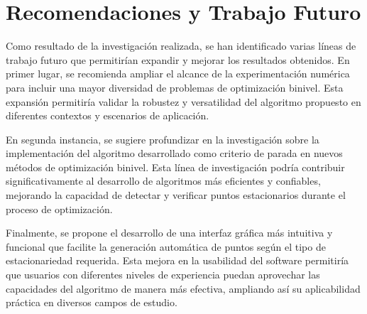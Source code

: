 \chapter{Recomendaciones y Trabajo Futuro}

Como resultado de la investigación realizada, se han identificado varias líneas de trabajo futuro que permitirían expandir y mejorar los resultados obtenidos. En primer lugar, se recomienda ampliar el alcance de la experimentación numérica para incluir una mayor diversidad de problemas de optimización binivel. Esta expansión permitiría validar la robustez y versatilidad del algoritmo propuesto en diferentes contextos y escenarios de aplicación.

En segunda instancia, se sugiere profundizar en la investigación sobre la implementación del algoritmo desarrollado como criterio de parada en nuevos métodos de optimización binivel. Esta línea de investigación podría contribuir significativamente al desarrollo de algoritmos más eficientes y confiables, mejorando la capacidad de detectar y verificar puntos estacionarios durante el proceso de optimización.

Finalmente, se propone el desarrollo de una interfaz gráfica más intuitiva y funcional que facilite la generación automática de puntos según el tipo de estacionariedad requerida. Esta mejora en la usabilidad del software permitiría que usuarios con diferentes niveles de experiencia puedan aprovechar las capacidades del algoritmo de manera más efectiva, ampliando así su aplicabilidad práctica en diversos campos de estudio.